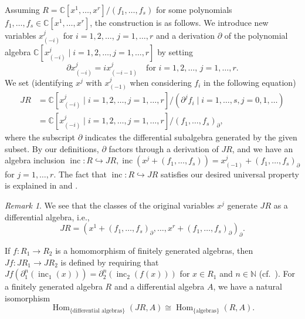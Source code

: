 \documentclass[a4paper, 12pt, reqno]{amsart}
\theoremstyle{remark}
\newtheorem{remark}[theorem]{Remark}
\DeclareMathOperator{\Hom}{Hom}
\DeclareMathOperator{\inc}{inc}
\begin{document}
Assuming $R = \mathbb{C}[x^1, \dots, x^r]/(f_1, \dots, f_s)$ for some polynomials $f_1, \dots, f_s \in \mathbb{C}[x^1, \dots, x^r]$, the construction is as follows.
We introduce new variables $x^j_{(-i)}$ for $i = 1, 2, \dots$, $j = 1, \dots, r$ and a derivation $\partial$ of the polynomial algebra $\mathbb{C}[x^j_{(-i)} \mid i = 1, 2, \dots, j = 1, \dots, r]$ by setting
\begin{equation*}
  \partial x^j_{(-i)} = ix^j_{(-i - 1)} \quad \text{for $i = 1, 2, \dots$, $j = 1, \dots, r$}.
\end{equation*}
We set (identifying $x^j$ with $x^j_{(-1)}$ when considering $f_i$ in the following equation)
\begin{align*}
  JR &= \mathbb{C}[x^j_{(-i)} \mid i = 1, 2, \dots, j = 1, \dots, r]/(\partial^jf_i \mid i = 1, \dots, s, j = 0, 1, \dots) \\
     &= \mathbb{C}[x^j_{(-i)} \mid i = 1, 2, \dots, j = 1, \dots, r]/(f_1, \dots, f_s)_{\partial},
\end{align*}
where the subscript $\partial$ indicates the differential subalgebra generated by the given subset.
By our definitions, $\partial$ factors through a derivation of $JR$, and we have an algebra inclusion $\inc: R \hookrightarrow JR, \inc(x^j + (f_1, \dots, f_s)) = x^j_{(-1)} + (f_1, \dots, f_s)_{\partial}$ for $j = 1, \dots, r$.
The fact that $\inc: R \hookrightarrow JR$ satisfies our desired universal property is explained in \cite[\S2.3]{arakawa_remark_2012} and \cite{ein_jet_2008}.

\begin{remark}
  \label{rmk:7}
  We see that the classes of the original variables $x^j$ generate $JR$ as a differential algebra, i.e.,
  \begin{equation*}
    JR = (x^1 + (f_1, \dots, f_s)_{\partial}, \dots, x^r + (f_1, \dots, f_s)_{\partial})_{\partial}.
  \end{equation*}
\end{remark}

If $f: R_1 \to R_2$ is a homomorphism of finitely generated algebras, then $Jf: JR_1 \to JR_2$ is defined by requiring that $Jf(\partial_1^n(\inc_1(x))) = \partial^n_2(\inc_2(f(x)))$ for $x \in R_1$ and $n \in \mathbb{N}$ (cf.\ ).
For a finitely generated algebra $R$ and a differential algebra $A$, we have a natural isomorphism
\begin{equation*}
  \Hom_{\{\text{differential algebras}\}}(JR, A) \cong \Hom_{\{\text{algebras}\}}(R, A).
\end{equation*}
\end{document}
